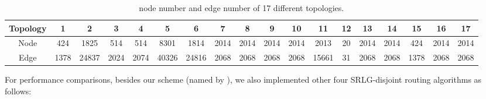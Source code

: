 %
\begin{table}[tp]
\small{
  \centering
  \begin{tabular}{*{18}{c}}
\toprule
Topology & 1 & 2 & 3 & 4 & 5 & 6& 7&8&9&10&11&12&13&14&15&16&17 \\
\midrule
Node  & 424  & 1825 & 514&514 &8301 &1814 &2014 & 2014&2014 & 2014& 2013&20 &2014 &2014 & 424&2014 & 2014   \\
Edge & 1378  & 24837 & 2024& 2074& 40326&24816 &2068 &2068 & 2068& 2068& 15661 & 31& 2068& 2068&1378 & 2068&2068 \\
\bottomrule
\end{tabular}
}
\caption{node number and edge number of 17 different topologies.}
\label{tab:AllSample}
\end{table}
For performance comparisons, besides our scheme (named by \CI), we also implemented other four SRLG-disjoint routing algorithms as follows:


